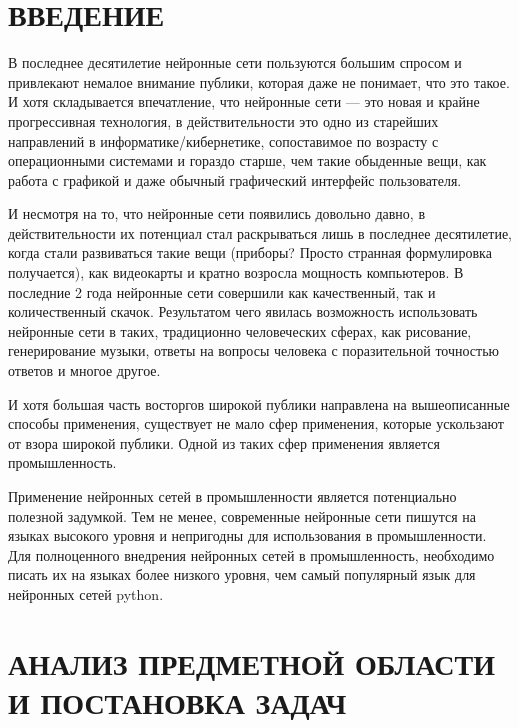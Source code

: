 \documentclass[a4paper,12pt,oneside]{extarticle}
\begin{document}
	\section{ВВЕДЕНИЕ}
	\begin{flushleft}
		В последнее десятилетие нейронные сети пользуются большим спросом и привлекают немалое внимание публики, которая даже не понимает, что это такое. И хотя складывается впечатление, что нейронные сети — это новая и крайне прогрессивная технология, в действительности это одно из старейших направлений в информатике/кибернетике, сопоставимое по возрасту с операционными системами и гораздо старше, чем такие обыденные вещи, как работа с графикой и даже обычный графический интерфейс пользователя.
	\end{flushleft}
	
	\begin{flushleft}
		И несмотря на то, что нейронные сети появились довольно давно, в действительности их потенциал стал раскрываться лишь в последнее десятилетие, когда стали развиваться такие вещи (приборы? Просто странная формулировка получается), как видеокарты и кратно возросла мощность компьютеров. В последние 2 года нейронные сети совершили как качественный, так и количественный скачок. Результатом чего явилась возможность использовать нейронные сети в таких, традиционно человеческих сферах, как рисование, генерирование музыки, ответы на вопросы человека с поразительной точностью ответов и многое другое.
	\end{flushleft}
	
	\begin{flushleft}
		И хотя большая часть восторгов широкой публики направлена на вышеописанные способы применения, существует не мало сфер применения, которые ускользают от взора широкой публики. Одной из таких сфер применения является промышленность. 
	\end{flushleft}
	
	\begin{flushleft}
		Применение нейронных сетей в промышленности является потенциально полезной задумкой. Тем не менее, современные нейронные сети пишутся на языках высокого уровня и непригодны для использования в промышленности. Для полноценного внедрения нейронных сетей в промышленность, необходимо писать их на языках более низкого уровня, чем самый популярный язык для нейронных сетей python.
	\end{flushleft}
	
	\newpage
	
	\section{АНАЛИЗ ПРЕДМЕТНОЙ ОБЛАСТИ И ПОСТАНОВКА ЗАДАЧ}
	
\end{document}
